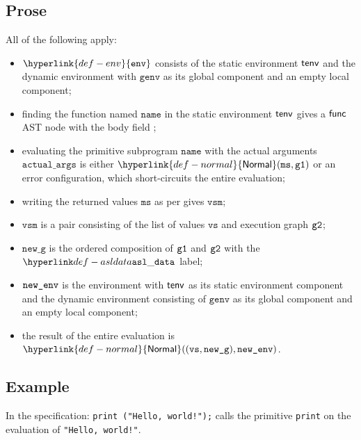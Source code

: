 \documentclass{book}
\newcommand\ProseOrError[0]{or an error configuration, which short-circuits the entire evaluation}
\newcommand\Normal[0]{\hyperlink{def-normal}{\textsf{Normal}}}
\newcommand\env[0]{\hyperlink{def-env}{\texttt{env}}}
\newcommand\newg[0]{\texttt{new\_g}}
\newcommand\vvs[0]{\texttt{vs}}
\newcommand\vms[0]{\texttt{ms}}
\newcommand\name[0]{\texttt{name}}
\newcommand\actualargs[0]{\texttt{actual\_args}}
\newcommand\genv[0]{\texttt{genv}}
\newcommand\vvsm[0]{\texttt{vsm}}
\begin{document}
  \subsection{Prose}
  All of the following apply:
  \begin{itemize}
  \item $\env$ consists of the static environment $\textsf{tenv}$ and the dynamic environment with $\genv$ as its
  global component and an empty local component;
  \item finding the function named $\name$ in the static environment $\textsf{tenv}$ gives a $\textsf{func}$ AST node
  with the body field \SBPrimitive;
  \item evaluating the primitive subprogram $\name$ with the actual arguments $\actualargs$
  is either $\Normal(\vms, \vgone)$ \ProseOrError;
  \item writing the returned values $\vms$ as per  gives $\vvsm$;
  \item $\vvsm$ is a pair consisting of the list of values $\vvs$ and execution graph $\texttt{g2}$;
  \item $\newg$ is the ordered composition of $\texttt{g1}$ and $\texttt{g2}$ with the $\asldata$ label;
  \item $\texttt{new\_env}$ is the environment with $\textsf{tenv}$ as its static environment component
  and the dynamic environment consisting of $\genv$ as its global component and an empty local component;
  \item the result of the entire evaluation is $\Normal((\vvs, \newg), \newenv)$.
  \end{itemize}

  \subsection{Example}
  In the specification:
  \texttt{print ("Hello, world!");} calls the primitive \texttt{print} on the evaluation of \texttt{"Hello, world!"}.


\end{document}
